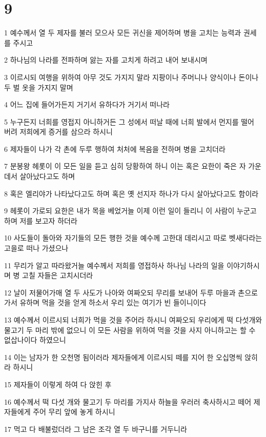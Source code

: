 \chapter{9}

\par 1 예수께서 열 두 제자를 불러 모으사 모든 귀신을 제어하며 병을 고치는 능력과 권세를 주시고
\par 2 하나님의 나라를 전파하며 앓는 자를 고치게 하려고 내어 보내시며
\par 3 이르시되 여행을 위하여 아무 것도 가지지 말라 지팡이나 주머니나 양식이나 돈이나 두 벌 옷을 가지지 말며
\par 4 어느 집에 들어가든지 거기서 유하다가 거기서 떠나라
\par 5 누구든지 너희를 영접지 아니하거든 그 성에서 떠날 때에 너희 발에서 먼지를 떨어 버려 저희에게 증거를 삼으라 하시니
\par 6 제자들이 나가 각 촌에 두루 행하여 처처에 복음을 전하며 병을 고치더라
\par 7 분봉왕 헤롯이 이 모든 일을 듣고 심히 당황하여 하니 이는 혹은 요한이 죽은 자 가운데서 살아났다고도 하며
\par 8 혹은 엘리야가 나타났다고도 하며 혹은 옛 선지자 하나가 다시 살아났다고도 함이라
\par 9 헤롯이 가로되 요한은 내가 목을 베었거늘 이제 이런 일이 들리니 이 사람이 누군고 하며 저를 보고자 하더라
\par 10 사도들이 돌아와 자기들의 모든 행한 것을 예수께 고한대 데리시고 따로 벳새다라는 고을로 떠나 가셨으나
\par 11 무리가 알고 따라왔거늘 예수께서 저희를 영접하사 하나님 나라의 일을 이야기하시며 병 고칠 자들은 고치시더라
\par 12 날이 저물어가매 열 두 사도가 나아와 여짜오되 무리를 보내어 두루 마을과 촌으로 가서 유하며 먹을 것을 얻게 하소서 우리 있는 여기가 빈 들이니이다
\par 13 예수께서 이르시되 너희가 먹을 것을 주어라 하시니 여짜오되 우리에게 떡 다섯개와 물고기 두 마리 밖에 없으니 이 모든 사람을 위하여 먹을 것을 사지 아니하고는 할 수 없삽나이다 하였으니
\par 14 이는 남자가 한 오천명 됨이러라 제자들에게 이르시되 떼를 지어 한 오십명씩 앉히라 하시니
\par 15 제자들이 이렇게 하여 다 앉힌 후
\par 16 예수께서 떡 다섯 개와 물고기 두 마리를 가지사 하늘을 우러러 축사하시고 떼어 제자들에게 주어 무리 앞에 놓게 하시니
\par 17 먹고 다 배불렀더라 그 남은 조각 열 두 바구니를 거두니라
